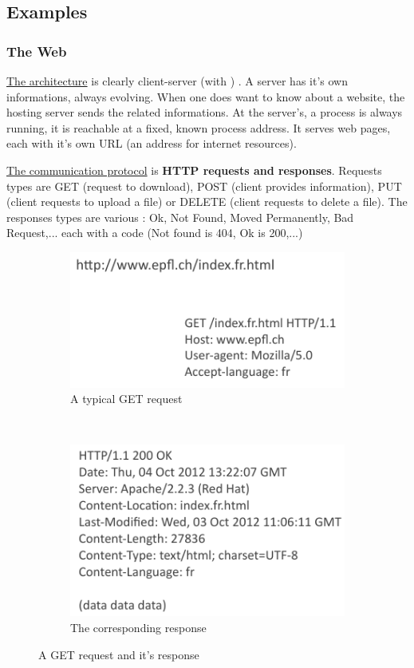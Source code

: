\documentclass[12pt,a4paper]{article}
\begin{document}
\subsection{Examples}
\subsubsection{The Web} 
\uline{The architecture} is clearly client-server (with ) . A server has it's own informations, always evolving. When one does want to know about a website, the hosting server sends the related informations. At the server's, a process is always running, it is reachable at a fixed, known process address. It serves web pages, each with it's own URL (an address for internet resources).
	
\uline{The communication protocol} is \textbf{HTTP requests and responses}. Requests types are GET (request to download), POST (client provides information), PUT (client requests to upload a file) or DELETE (client requests to delete a file). The responses types are various : Ok, Not Found, Moved Permanently, Bad Request,... each with a code (Not found is 404, Ok is 200,...)

\begin{figure}[h]
	\centering
	\begin{subfigure}[b]{0.45\textwidth}
		\includegraphics[scale=0.6]{images/requestHTTP}
		\caption{A typical GET request}
		\label{fig: get request}
	\end{subfigure}
	~
	\begin{subfigure}[b]{0.45\textwidth}
		\includegraphics[scale=0.6]{images/responseHTTP}
		\caption{The corresponding response}
		\label{fig: http response}
	\end{subfigure}
	\caption{A GET request and it's response}
	\label{figures: get + response}
\end{figure}
\end{document}
